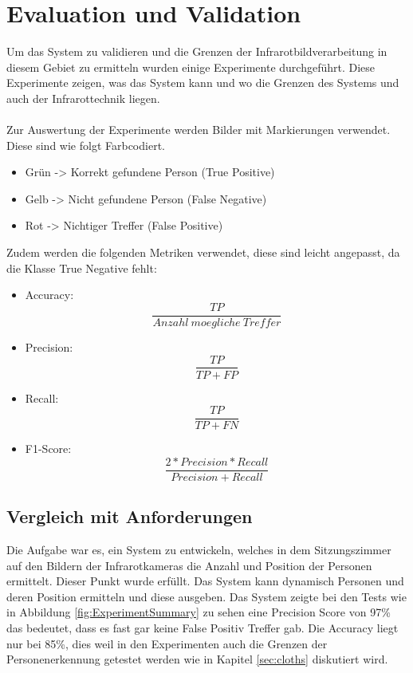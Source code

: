 \chapter{Evaluation und Validation}
\label{ch:Eval}

Um das System zu validieren und die Grenzen der Infrarotbildverarbeitung in diesem Gebiet zu ermitteln wurden einige Experimente durchgeführt. Diese Experimente zeigen, was das System kann und wo die Grenzen des Systems und auch der Infrarottechnik liegen.\\
\\
Zur Auswertung der Experimente werden Bilder mit Markierungen verwendet. Diese sind wie folgt Farbcodiert.

\begin{itemize}
	\item Grün -> Korrekt gefundene Person (True Positive)
	\item Gelb -> Nicht gefundene Person (False Negative)
	\item Rot -> Nichtiger Treffer (False Positive)\\
\end{itemize}
Zudem werden die folgenden Metriken verwendet, diese sind leicht angepasst, da die Klasse True Negative fehlt:

\begin{itemize}
	\item Accuracy: \[\dfrac{TP}{Anzahl\: moegliche\: Treffer}\]
	\item Precision: \[\dfrac{TP}{TP + FP}\]
	\item Recall: \[\dfrac{TP}{TP + FN}\]
	\item F1-Score: \[\dfrac{2*Precision*Recall}{Precision + Recall}\]
\end{itemize}


\section{Vergleich mit Anforderungen}
\label{sec:VergleichAnforderungen}

Die Aufgabe war es, ein System zu entwickeln, welches in dem Sitzungszimmer auf den Bildern der Infrarotkameras die Anzahl und Position der Personen ermittelt. Dieser Punkt wurde erfüllt. Das System kann dynamisch Personen und deren Position ermitteln und diese ausgeben. Das System zeigte bei den Tests wie in Abbildung \ref{fig:ExperimentSummary} zu sehen eine Precision Score von 97\% das bedeutet, dass es fast gar keine False Positiv Treffer gab. Die Accuracy liegt nur bei 85\%, dies weil in den Experimenten auch die Grenzen der Personenerkennung getestet werden wie in Kapitel \ref{sec:cloths} diskutiert wird.

